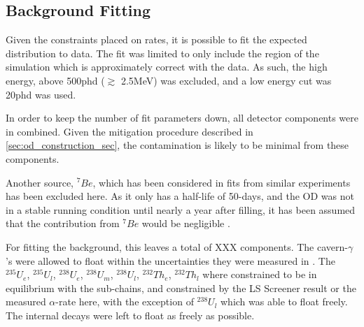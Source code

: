 \subsection{Background Fitting}
\par
Given the constraints placed on rates, it is possible to fit the expected distribution to data. 
The fit was limited to only include the region of the simulation which is approximately correct with the data. 
As such, the high energy, above 500phd ($\gtrsim$ 2.5MeV) was excluded, and a low energy cut was 20phd was used.
\par
In order to keep the number of fit parameters down, all detector components were in combined.
Given the mitigation procedure described in \autoref{sec:od_construction_sec}, the contamination is likely to be minimal from these components.
\par
Another source, ${}^{7}Be$, which has been considered in fits from similar experiments has been excluded here.
As it only has a half-life of 50-days, and the OD was not in a stable running condition until nearly a year after filling, it has been assumed that the contribution from ${}^{7}Be$ would be negligible \cite{be7_decay_ref}.
\par
For fitting the background, this leaves a total of XXX components.
The cavern-$\gamma$'s were allowed to float within the uncertainties they were measured in \cite{LZ_Gamma_Ray_Background_ref}.
The ${}^{235}U_e$, ${}^{235}U_l$, ${}^{238}U_e$, ${}^{238}U_m$, ${}^{238}U_l$, ${}^{232}Th_e$, ${}^{232}Th_l$ where constrained to be in equilibrium with the sub-chains, and constrained by the LS Screener result or the measured $\alpha$-rate here, with the exception of ${}^{238}U_l$ which was able to float freely.
The internal decays were left to float as freely as possible.





